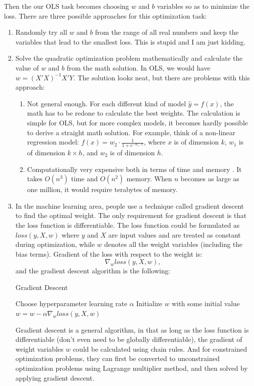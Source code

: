 \documentclass[a4paper]{article}
\begin{document}
Then the our OLS task becomes choosing $w$ and $b$ variables so as to minimize the loss. There are three possible approaches for this optimization task:
\begin{enumerate}
 \item Randomly try all $w$ and $b$ from the range of all real numbers and keep the variables that lead to the smallest loss. This is stupid and I am just kidding.
 \item Solve the quadratic optimization problem mathematically and calculate the value of $w$ and $b$ from the math solution. In OLS, we would have $w = (X′X)^{-1}X′Y$. The solution looks neat, but there are problems with this approach:
 \begin{enumerate}
  \item Not general enough. For each different kind of model $\hat{y} = f(x)$, the math has to be redone to calculate the best weights. The calculation is simple for OLS, but for more complex models, it becomes hardly possible to derive a straight math solution. For example, think of a non-linear regression model: $f(x) = w_2 \cdot \frac{1}{1+ e^{-w_1\cdot x}}$, where $x$ is of dimension $k$, $w_1$ is of dimension $k\times h$, and $w_2$ is of dimension $h$.
  \item Computationally very expensive both in terms of time and memory \citep{CookInvMat}. It takes $O(n^3)$ time and $O(n^2)$ memory. When $n$ becomes as large as one million, it would require terabytes of memory.
 \end{enumerate}
\item In the machine learning area, people use a technique called gradient descent to find the optimal weight. The only requirement for gradient descent is that the loss function is differentiable. The loss function could be formulated as $loss(y,X,w)$ where $y$ and $X$ are input values and are treated as constant during optimization, while $w$ denotes all the weight variables (including the bias terms). Gradient of the loss with respect to the weight is:
\begin{equation}
 \nabla_w loss(y,X,w),
\end{equation}
and the gradient descent algorithm is the following:

\begin{algorithm}
\caption{Gradient Descent}\label{euclid}
\begin{algorithmic}[1]
\State Choose hyperparameter learning rate $\alpha$ 
\State Initialize $w$ with some initial value
\Repeat
\State $w = w - \alpha \nabla_w loss(y,X,w)$
\end{algorithmic}
\end{algorithm}

Gradient descent is a general algorithm, in that as long as the loss function is differentiable (don't even need to be globally differentiable), the gradient of weight variables $w$ could be calculated using chain rules. And for constrained optimization problems, they can first be converted to unconstrained optimization problems using Lagrange multiplier method, and then solved by applying gradient descent.
\end{enumerate}
\end{document}
